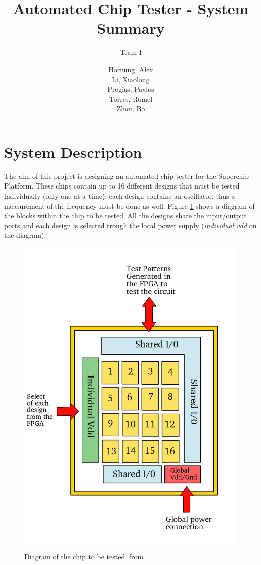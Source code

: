 \documentclass[a4paper,11pt]{report}
\title{Automated Chip Tester - System Summary}
\author{Team I}
\author{
 Hornung, Alex \\
 Li, Xiaolong\\
 Progias, Pavlos\\
 Torres, Romel\\
 Zhou, Bo\\
}
\begin{document}
\maketitle

\cfoot{\thepage}

\section*{System Description}
The aim of this project is designing an automated chip tester for the Superchip
Platform\cite{superchip}. These chips contain up to 16 different
designs that must be tested individually (only one at a time); each design
contains an oscillator, thus a measurement of the frequency must be done as
well. Figure \ref{fig:chip_diagram}
shows a diagram of the blocks within the chip to be tested. All the designs
share the input/output ports and each design is selected trough the local power
supply (\emph{individual vdd} on the diagram).
\\


\begin{figure}[htb]
\centering
\includegraphics[scale=0.25]{Chip.png}
\caption{Diagram of the chip to be tested, from \cite{superchip}}
\label{fig:chip_diagram}
\end{figure}
\end{document}
